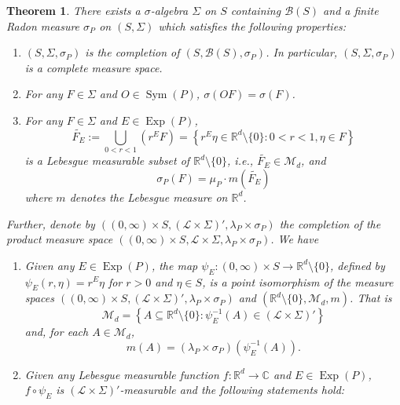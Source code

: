 \documentclass[11pt]{article}
\newtheorem{theorem}{Theorem}[section]
\theoremstyle{remark}
\newcommand\Sym{\operatorname{Sym}}
\newcommand\Exp{\operatorname{Exp}}
\begin{document}
\begin{theorem}\label{thm:BestIntegrationFormula}
There exists a $\sigma$-algebra $\Sigma$ on $S$ containing $\mathcal{B}(S)$ and a finite Radon measure $\sigma_P$ on $(S,\Sigma)$ which satisfies the following properties:
\begin{enumerate}
\item\label{property:Completion} $(S,\Sigma,\sigma_P)$ is the completion of $(S,\mathcal{B}(S),\sigma_P)$. In particular, $(S,\Sigma,\sigma_P)$ is a complete measure space.
\item\label{property:Invariance} For any $F\in\Sigma$ and $O\in\Sym(P)$, $\sigma(OF)=\sigma(F)$.
\item\label{property:DefiningConditionofsigma} For any $F\in\Sigma$ and $E\in\Exp(P)$, 
\begin{equation*}
\widetilde{F_E}:=\bigcup_{0<r<1}\left(r^E F\right)=\left\{r^E\eta\in\mathbb{R}^d\setminus\{0\}:0<r<1,\eta\in F\right\}
\end{equation*}
is a Lebesgue measurable subset of $\mathbb{R}^d\setminus \{0\}$, i.e., $\widetilde{F_E}\in\mathcal{M}_d$, and
\begin{equation*}
\sigma_P(F)=\mu_P\cdot m\left(\widetilde{F_E}\right)
\end{equation*}
where $m$ denotes the Lebesgue measure on $\mathbb{R}^d$.
\end{enumerate}
Further, denote by $\left((0,\infty)\times S,(\mathcal{L}\times\Sigma)',\lambda_P\times\sigma_P\right)$ the completion of the product measure space $((0,\infty)\times S,\mathcal{L}\times\Sigma,\lambda_P\times\sigma_P)$. We have
\begin{enumerate}
\item\label{property:BestPointIsomorphism} Given any $E\in \Exp(P)$, the map $\psi_E:(0,\infty)\times S\to\mathbb{R}^d\setminus\{0\}$, defined by $\psi_E(r,\eta)=r^E\eta$ for $r>0$ and $\eta\in S$, is a point isomorphism of the measure spaces $\left((0,\infty)\times S,(\mathcal{L}\times\Sigma)',\lambda_P\times\sigma_P\right)$ and $(\mathbb{R}^d\setminus\{0\},\mathcal{M}_d,m)$. That is
\begin{equation*}
\mathcal{M}_d=\left\{A\subseteq \mathbb{R}^d\setminus\{0\}:\psi_E^{-1}(A)\in (\mathcal{L}\times\Sigma)'\right\}
\end{equation*}
and, for each $A\in\mathcal{M}_d$,
\begin{equation*}
m(A)=(\lambda_P\times\sigma_P)(\psi_E^{-1}(A)).
\end{equation*}
\item\label{property:BestIntegrationFormula} Given any Lebesgue measurable function $f:\mathbb{R}^d\to\mathbb{C}$ and $E\in \Exp(P)$, $f\circ \psi_E$ is $(\mathcal{L}\times\Sigma)'$-measurable and the following statements hold:

\end{enumerate}
\end{theorem}
\end{document}
